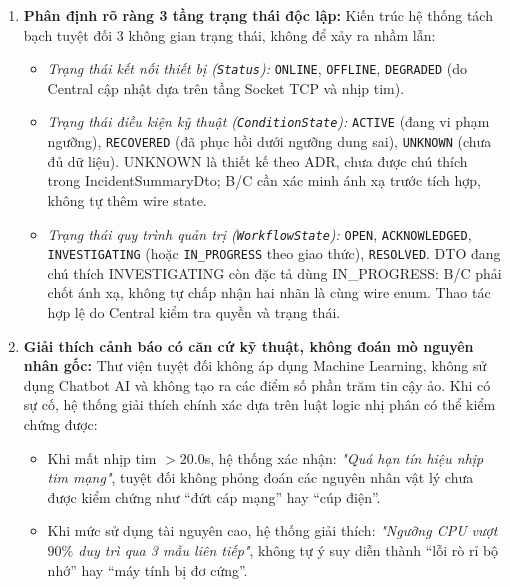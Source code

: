 \documentclass[12pt,a4paper]{article}
\begin{document}
\begin{enumerate}
  \item \textbf{Phân định rõ ràng 3 tầng trạng thái độc lập:}
  Kiến trúc hệ thống tách bạch tuyệt đối 3 không gian trạng thái, không để xảy ra nhầm lẫn:
  \begin{itemize}
    \item \textit{Trạng thái kết nối thiết bị (\texttt{Status}):} \texttt{ONLINE}, \texttt{OFFLINE}, \texttt{DEGRADED} (do Central cập nhật dựa trên tầng Socket TCP và nhịp tim).
    \item \textit{Trạng thái điều kiện kỹ thuật (\texttt{ConditionState}):} \texttt{ACTIVE} (đang vi phạm ngưỡng), \texttt{RECOVERED} (đã phục hồi dưới ngưỡng dung sai), \texttt{UNKNOWN} (chưa đủ dữ liệu). UNKNOWN là thiết kế theo ADR, chưa được chú thích trong IncidentSummaryDto; B/C cần xác minh ánh xạ trước tích hợp, không tự thêm wire state.
    \item \textit{Trạng thái quy trình quản trị (\texttt{WorkflowState}):} \texttt{OPEN}, \texttt{ACKNOWLEDGED}, \texttt{INVESTIGATING} (hoặc \texttt{IN\_PROGRESS} theo giao thức), \texttt{RESOLVED}. DTO đang chú thích INVESTIGATING còn đặc tả dùng IN\_PROGRESS: B/C phải chốt ánh xạ, không tự chấp nhận hai nhãn là cùng wire enum. Thao tác hợp lệ do Central kiểm tra quyền và trạng thái.
  \end{itemize}

  \item \textbf{Giải thích cảnh báo có căn cứ kỹ thuật, không đoán mò nguyên nhân gốc:}
  Thư viện tuyệt đối không áp dụng Machine Learning, không sử dụng Chatbot AI và không tạo ra các điểm số phần trăm tin cậy ảo. Khi có sự cố, hệ thống giải thích chính xác dựa trên luật logic nhị phân có thể kiểm chứng được:
  \begin{itemize}
    \item Khi mất nhịp tim $> 20.0$s, hệ thống xác nhận: \textit{"Quá hạn tín hiệu nhịp tim mạng"}, tuyệt đối không phỏng đoán các nguyên nhân vật lý chưa được kiểm chứng như ``đứt cáp mạng'' hay ``cúp điện''.
    \item Khi mức sử dụng tài nguyên cao, hệ thống giải thích: \textit{"Ngưỡng CPU vượt $90\%$ duy trì qua 3 mẫu liên tiếp"}, không tự ý suy diễn thành ``lỗi rò rỉ bộ nhớ'' hay ``máy tính bị đơ cứng''.
  \end{itemize}


\end{enumerate}
\end{document}
